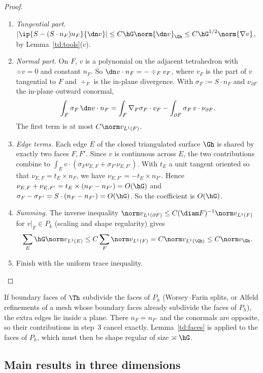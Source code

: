 \begin{proof}
\begin{enumerate}
\item \emph{Tangential part.} $|\ip{S-(S\cdot n_F)n_F}{\dn v}|\le C\hG\norm{\dn v}_{\Gh}\le C\hG^{1/2}\norm{\nabla v}$, by Lemma~\ref{td:tools}(c).
\item \emph{Normal part.} On $F$, $v$ is a polynomial on the adjacent tetrahedron with $\div v=0$ and constant $n_F$. So $\dn v\cdot n_F=-\div_F v_F$, where $v_F$ is the part of $v$ tangential to $F$ and $\div_F$ is the in-plane divergence. With $\sigma_F:=S\cdot n_F$ and $\nu_{\partial F}$ the in-plane outward conormal,
\[
\int_F\sigma_F\,\dn v\cdot n_F=\int_F\nabla_F\sigma_F\cdot v_F-\int_{\partial F}\sigma_F\,v\cdot\nu_{\partial F}.
\]
The first term is at most $C\norm v_{L^1(F)}$.
\item \emph{Edge terms.} Each edge $E$ of the closed triangulated surface $\Gh$ is shared by exactly two faces $F,F'$. Since $v$ is continuous across $E$, the two contributions combine to $\int_Ev\cdot(\sigma_F\nu_{E,F}+\sigma_{F'}\nu_{E,F'})$. With $t_E$ a unit tangent oriented so that $\nu_{E,F}=t_E\times n_F$, we have $\nu_{E,F'}=-t_E\times n_{F'}$. Hence $\nu_{E,F}+\nu_{E,F'}=t_E\times(n_F-n_{F'})=O(\hG)$ and $\sigma_F-\sigma_{F'}=S\cdot(n_F-n_{F'})=O(\hG)$. So the coefficient is $O(\hG)$.
\item \emph{Summing.} The inverse inequality $\norm v_{L^1(\partial F)}\le C(\diam F)^{-1}\norm v_{L^1(F)}$ for $v|_F\in P_k$ (scaling and shape regularity) gives
\[
\sum_E\hG\norm v_{L^1(E)}\le C\sum_F\norm v_{L^1(F)}=C\norm v_{L^1(\Gh)}\le C\norm v_{\Gh}.
\]
\item Finish with the uniform trace inequality.\qedhere
\end{enumerate}
\end{proof}

\begin{remark}\label{td:wf}
If boundary faces of $\Th$ subdivide the faces of $P_h$ (Worsey--Farin splits, or Alfeld refinements of a mesh whose boundary faces already subdivide the faces of $P_h$), the extra edges lie inside a plane. There $n_F=n_{F'}$ and the conormals are opposite, so their contributions in step~3 cancel exactly. Lemma~\ref{td:faces} is applied to the faces of $P_h$, which must then be shape regular of size $\asymp\hG$.
\end{remark}

\subsection{Main results in three dimensions}

